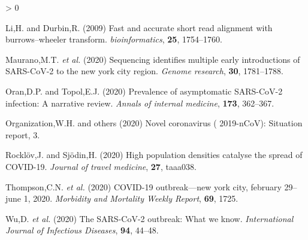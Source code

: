 \documentclass[
]{article}
\newlength{\cslhangindent}
\newenvironment{CSLReferences}[2] %
 {%
  \setlength{\parindent}{0pt}
  \ifodd #1 \everypar{\setlength{\hangindent}{\cslhangindent}}\ignorespaces\fi
  \ifnum #2 > 0
  \setlength{\parskip}{#2\baselineskip}
  \fi
 }%
 {}
\begin{document}
\begin{CSLReferences}{1}{0}
\leavevmode\hypertarget{ref-li2009fast}{}%
Li,H. and Durbin,R. (2009) Fast and accurate short read alignment with
burrows--wheeler transform. \emph{bioinformatics}, \textbf{25},
1754--1760.

\leavevmode\hypertarget{ref-maurano2020sequencing}{}%
Maurano,M.T. \emph{et al.} (2020) Sequencing identifies multiple early
introductions of SARS-CoV-2 to the new york city region. \emph{Genome
research}, \textbf{30}, 1781--1788.

\leavevmode\hypertarget{ref-oran2020prevalence}{}%
Oran,D.P. and Topol,E.J. (2020) Prevalence of asymptomatic SARS-CoV-2
infection: A narrative review. \emph{Annals of internal medicine},
\textbf{173}, 362--367.

\leavevmode\hypertarget{ref-world2020novel}{}%
Organization,W.H. and others (2020) Novel coronavirus (‎ 2019-nCoV)‎:
Situation report, 3.

\leavevmode\hypertarget{ref-rocklov2020high}{}%
Rocklöv,J. and Sjödin,H. (2020) High population densities catalyse the
spread of COVID-19. \emph{Journal of travel medicine}, \textbf{27},
taaa038.

\leavevmode\hypertarget{ref-thompson2020covid}{}%
Thompson,C.N. \emph{et al.} (2020) COVID-19 outbreak---new york city,
february 29--june 1, 2020. \emph{Morbidity and Mortality Weekly Report},
\textbf{69}, 1725.

\leavevmode\hypertarget{ref-wu2020sars}{}%
Wu,D. \emph{et al.} (2020) The SARS-CoV-2 outbreak: What we know.
\emph{International Journal of Infectious Diseases}, \textbf{94},
44--48.

\end{CSLReferences}
\end{document}
